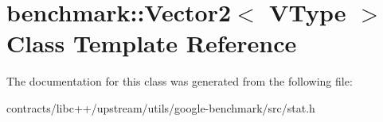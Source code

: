 \hypertarget{classbenchmark_1_1_vector2}{}\section{benchmark\+:\+:Vector2$<$ V\+Type $>$ Class Template Reference}
\label{classbenchmark_1_1_vector2}


The documentation for this class was generated from the following file\+:\begin{DoxyCompactItemize}
\item 
contracts/libc++/upstream/utils/google-\/benchmark/src/stat.\+h\end{DoxyCompactItemize}
